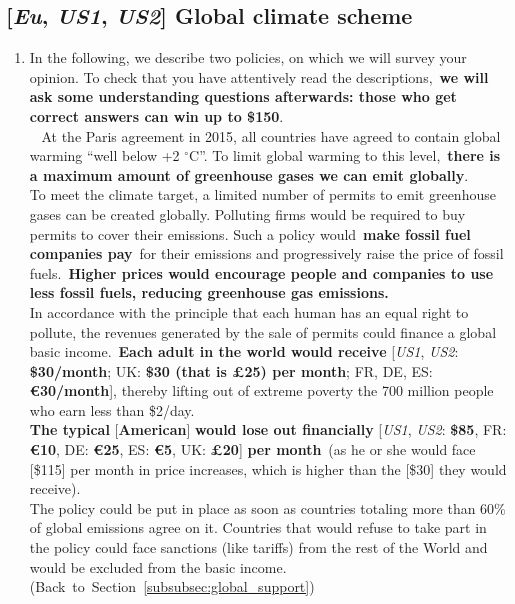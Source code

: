 \subsection*{[\textit{Eu}, \textit{US1}, \textit{US2}] Global climate scheme}\label{subsec:questionnaire_GCS}
\begin{enumerate}[resume] \item[] In the following, we describe two policies, on which we will survey your opinion. To check that you have attentively read the descriptions,~\textbf{we will ask some understanding questions afterwards: those who get correct answers can win up to \$150}. \\
\textbf{}~ At the Paris agreement in 2015, all countries have agreed to contain global warming ``well below +2 $\mathrm{{}^\circ}$C''. To limit global warming to this level,~\textbf{there is a maximum amount of greenhouse gases we can emit globally}.\\
To meet the climate target, a limited number of permits to emit greenhouse gases can be created globally. Polluting firms would be required to buy permits to cover their emissions. Such a policy would~\textbf{make fossil fuel companies pay}~for their emissions and progressively raise the price of fossil fuels.~\textbf{Higher prices would encourage people and companies to use less fossil fuels, reducing greenhouse gas emissions.}\\
In accordance with the principle that each human has an equal right to pollute, the revenues generated by the sale of permits could finance a global basic income.~\textbf{Each adult in the world would receive } [\textit{US1}, \textit{US2}: \textbf{\$30/month}; UK: \textbf{\$30 (that is £25) per month}; FR, DE, ES:  \textbf{\euro{}30/month}], thereby lifting out of extreme poverty the 700 million people who earn less than \$2/day.\\
\textbf{The typical }[\textbf{American}]\textbf{ would lose out financially }[\textit{US1}, \textit{US2}: \textbf{\$85}, FR: \textbf{\euro{}10}, DE: \textbf{\euro{}25}, ES: \textbf{\euro{}5}, UK: \textbf{£20}]\textbf{ per month}~(as he or she would face [\$115] per month in price increases, which is higher than the [\$30] they would receive). 
\\The policy could be put in place as soon as countries totaling more than 60\% of global emissions agree on it. Countries that would refuse to take part in the policy could face sanctions (like tariffs) from the rest of the World and would be excluded from the basic income. \hfill (Back~to~Section~\ref{subsubsec:global_support})

\end{enumerate}
